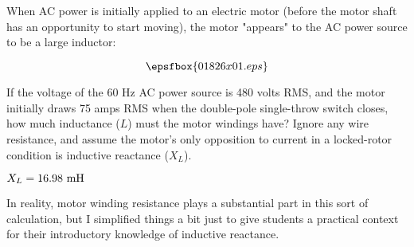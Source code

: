 

When AC power is initially applied to an electric motor (before the motor shaft has an opportunity to start moving), the motor "appears" to the AC power source to be a large inductor:

$$\epsfbox{01826x01.eps}$$

If the voltage of the 60 Hz AC power source is 480 volts RMS, and the motor initially draws 75 amps RMS when the double-pole single-throw switch closes, how much inductance ($L$) must the motor windings have?  Ignore any wire resistance, and assume the motor's only opposition to current in a locked-rotor condition is inductive reactance ($X_L$).







$X_L = 16.98 \hbox{ mH}$







In reality, motor winding resistance plays a substantial part in this sort of calculation, but I simplified things a bit just to give students a practical context for their introductory knowledge of inductive reactance.





